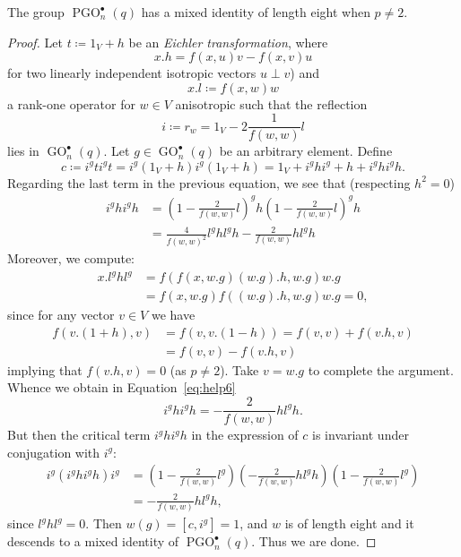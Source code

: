\documentclass[10pt,a4paper]{amsart}
\DeclareMathOperator{\GO}{GO}%
\DeclareMathOperator{\PGO}{PGO}%
\begin{document}
\begin{lemma}
The group $\PGO_n^\bullet(q)$ has a mixed identity of length eight when $p\neq 2$.
\end{lemma}

\begin{proof}
Let $t\coloneqq 1_V+h$ be an \emph{Eichler transformation}, where 
$$
x.h=f(x,u)v-f(x,v)u
$$ 
for two linearly independent isotropic vectors $u\perp v$) and 
$$
x.l\coloneqq f(x,w)w
$$ 
a rank-one operator for $w\in V$ anisotropic such that the reflection 
$$
i\coloneqq r_w=1_V-2\frac{1}{f(w,w)}l
$$ 
lies in $\GO_n^\bullet(q)$. Let $g\in\GO_n^\bullet(q)$ be an arbitrary element. Define 
$$
c\coloneqq i^gti^gt=i^g(1_V+h)i^g(1_V+h)=1_V+i^ghi^g+h+i^ghi^gh.
$$
Regarding the last term in the previous equation, we see that (respecting $h^2=0$)
\begin{align}
i^ghi^gh&=\left(1-\frac{2}{f(w,w)}l\right)^gh\left(1-\frac{2}{f(w,w)}l\right)^gh\nonumber\\
&=\frac{4}{f(w,w)^2}l^ghl^gh-\frac{2}{f(w,w)}hl^gh\label{eq:help6}
\end{align}
Moreover, we compute:
\begin{align*}
x.l^ghl^g &=f(f(x,w.g)(w.g).h,w.g)w.g\\
&=f(x,w.g)f((w.g).h,w.g)w.g=0,
\end{align*}
since for any vector $v\in V$ we have 
\begin{align*}
f(v.(1+h),v)&=f(v,v.(1-h))=f(v,v)+f(v.h,v)\\&
=f(v,v)-f(v.h,v)
\end{align*}
implying that $f(v.h,v)=0$ (as $p\neq 2$). Take $v=w.g$ to complete the argument.
Whence we obtain in Equation~\eqref{eq:help6}
$$
i^ghi^gh=-\frac{2}{f(w,w)}hl^g h.
$$	
But then the critical term $i^ghi^gh$ in the expression of $c$ is invariant under conjugation with $i^g$:
\begin{align*}
i^g(i^ghi^gh)i^g&=\left(1-\frac{2}{f(w,w)}l^g\right)\left(-\frac{2}{f(w,w)}hl^g h\right)\left(1-\frac{2}{f(w,w)}l^g\right)\\
&=-\frac{2}{f(w,w)}hl^g h,
\end{align*}
since $l^ghl^g=0$. Then $w(g)=[c,i^g]=1$, and $w$ is of length eight and it descends to a mixed identity of $\PGO_n^\bullet(q)$. Thus we are done.
\end{proof}
\end{document}

